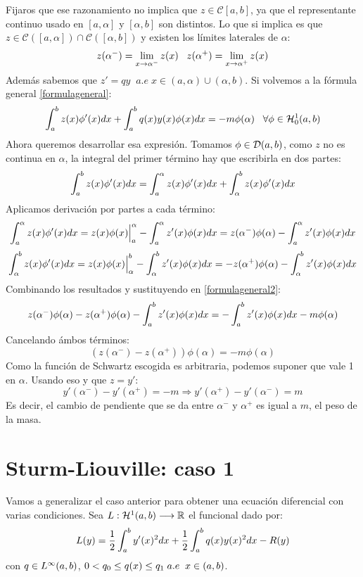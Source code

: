 Fijaros que ese razonamiento no implica que $z\in\mathcal{C}[a,b]$, ya que el representante continuo usado en $[a,\alpha]$ y $[\alpha,b]$ son distintos. Lo que si implica es que $z\in\mathcal{C}\left([a,\alpha]\right)\cap \mathcal{C}\left([\alpha,b]\right)$ y existen los límites laterales de $\alpha$:
\[
z(\alpha^-)=\displaystyle\lim_{ x \to \alpha^- } z(x) \;\;\; z(\alpha^+)=\displaystyle\lim_{ x \to \alpha^+ } z(x)
\]
Además sabemos que $z'=qy \;\; a.e \; x \in(a,\alpha)\cup(\alpha,b)$. Si volvemos a la fórmula general \eqref{formulageneral}:
\begin{equation}
\label{formulageneral2}
\displaystyle\int_{ a }^{ b } z(x)\phi'(x)dx+\displaystyle\int_{ a }^{ b } q(x)y(x)\phi(x)dx=-m\phi(\alpha) \;\;\; \forall\phi\in\mathcal{H}_0^{ 1 } (a,b)
\end{equation}
Ahora queremos desarrollar esa expresión. Tomamos $\phi\in\mathcal{D}(a,b)$, como $z$ no es continua en $\alpha$, la integral del primer término hay que escribirla en dos partes:
\[
\displaystyle\int_{ a }^{ b } z(x)\phi'(x)dx=\displaystyle\int_{ a }^{ \alpha } z(x)\phi'(x)dx+\displaystyle\int_{ \alpha }^{ b } z(x)\phi'(x)dx
\]
Aplicamos derivación por partes a cada término:
\[
\displaystyle\int_{ a }^{ \alpha } z(x)\phi'(x)dx=z(x)\phi(x)\Big|_a^\alpha-\displaystyle\int_{ a }^{ \alpha } z'(x)\phi(x)dx=z(\alpha^-)\phi(\alpha)-\displaystyle\int_{ a }^{ \alpha } z'(x)\phi(x)dx
\]
\[
\displaystyle\int_{ \alpha }^{ b } z(x)\phi'(x)dx=z(x)\phi(x)\Big|_\alpha^b-\displaystyle\int_{ \alpha }^{ b } z'(x)\phi(x)dx=-z(\alpha^+)\phi(\alpha)-\displaystyle\int_{ \alpha }^{ b } z'(x)\phi(x)dx
\]
Combinando los resultados y sustituyendo en \eqref{formulageneral2}:
\[
z(\alpha^-)\phi(\alpha)-z(\alpha^+)\phi(\alpha)-\displaystyle\int_{ a }^{ b } z'(x)\phi(x)dx=-\displaystyle\int_{ a }^{ b } z'(x)\phi(x)dx-m\phi(\alpha)
\]
Cancelando ámbos términos:
\[
\left(z(\alpha^-)-z(\alpha^+)\right)\phi(\alpha)=-m\phi(\alpha)
\]
Como la función de Schwartz escogida es arbitraria, podemos suponer que vale 1 en $\alpha$. Usando eso y que $z=y'$:
\[
y'(\alpha^-)-y'(\alpha^+)=-m \Rightarrow y'(\alpha^+)-y'(\alpha^-)=m  
\]
Es decir, el cambio de pendiente que se da entre $\alpha^-$ y $\alpha^+$ es igual a $m$, el peso de la masa.

\section{Sturm-Liouville: caso 1}

Vamos a generalizar el caso anterior para obtener una ecuación diferencial con varias condiciones. Sea $L : \mathcal{H}^{ 1 } (a,b) \longrightarrow \mathbb{R}$ el funcional dado por:
\[
L(y)=\frac{1}{2}\displaystyle\int_{ a }^{ b } y'(x)^2dx+\frac{1}{2}\displaystyle\int_{ a }^{ b } q(x)y(x)^2dx-R(y)
\]
con $q\in L^{ \infty }(a,b)$, $0<q_0\leq q(x)\leq q_1 \; a.e \;\; x\in(a,b)$. 


